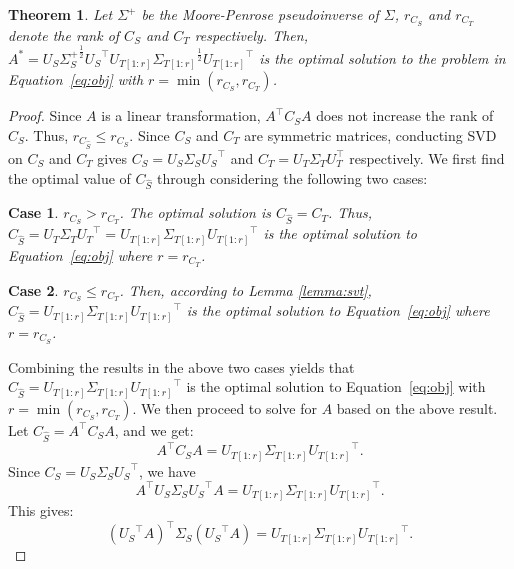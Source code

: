 \documentclass[letterpaper]{article}
\newtheorem{theorem}{Theorem}
\newtheorem{case}{Case}
\begin{document}
\begin{theorem} 
Let $\Sigma^{+}$ be the Moore-Penrose pseudoinverse of $\Sigma$, $r_{C_S}$ and $r_{C_T}$ denote the rank of $C_S$ and $C_T$ respectively.
Then, $A^{*} = U_{S}{\Sigma_S^{+}}^{\frac{1}{2}}{U_{S}}^{\top} U_{T[1:r]}{\Sigma_{T[1:r]}}^{\frac{1}{2}}{U_{T[1:r]}}^{\top}$ is the optimal solution to the problem in Equation~\eqref{eq:obj} with $r = \min(r_{C_S}, r_{C_T})$.
\end{theorem}
\begin{proof}  Since $A$ is a linear transformation, $A^{\top}C_SA$ does not increase the rank of $C_S$. Thus, $r_{C_{\hat{S}}}\leqslant{r_{C_{S}}}$. Since $C_S$ and $C_T$ are symmetric matrices, conducting SVD on $C_S$ and $C_T$ gives $C_S=U_S{\Sigma_S}{U_S}^{\top}$ and $C_T = U_T\Sigma_TU_T^\top$ respectively. We first find the optimal value of $C_{\hat{S}}$ through considering the following two  cases:
\vspace{-0.05in}
\begin{case}
$r_{C_S}>{r_{C_T}}$. The optimal solution is $C_{\hat{S}} = C_T$. Thus, $C_{\hat{S}} = U_{T}{\Sigma_{T}}{U_{T}}^{\top} = U_{T[1:r]}{\Sigma_{T[1:r]}}{U_{T[1:r]}}^{\top}$ is the optimal solution to Equation~\eqref{eq:obj} where $r = r_{C_T}$.
\end{case}
\vspace{-0.05in}
\begin{case}
$r_{C_S}\leqslant{r_{C_T}}$. Then, according to Lemma \ref{lemma:svt}, $C_{\hat{S}} = U_{T[1:r]}{\Sigma_{T[1:r]}}{U_{T[1:r]}}^{\top}$ is the optimal solution to Equation~\eqref{eq:obj} where $r = r_{C_S}$.
\end{case}
Combining the results in the above two cases yields that ${{C_{\hat{S}}}} = U_{T[1:r]}{\Sigma_{T[1:r]}}{U_{T[1:r]}}^{\top}$ is the optimal solution to Equation~\eqref{eq:obj} with $r = \min(r_{C_S}, r_{C_T})$.
We then proceed to solve for $A$ based on the above result. 
Let $C_{\hat{S}} = {A}^{\top}C_S A$, and we get:
\begin{equation*}
{A}^{\top}C_{S}{A}= U_{T[1:r]}{\Sigma_{T[1:r]}}{U_{T[1:r]}}^{\top}.
\end{equation*}
Since $C_S = U_S \Sigma_S {U_S}^\top$, we have
\begin{equation*}
{A}^{\top}U_S{\Sigma_S}{U_S}^{\top}{A}= U_{T[1:r]}{\Sigma_{T[1:r]}}{U_{T[1:r]}}^{\top}.
\end{equation*}
This gives:
\begin{equation*}
{({U_S}^{\top}A)}^{\top}{\Sigma_S}({U_S}^{\top}{A})= U_{T[1:r]}{\Sigma_{T[1:r]}}{U_{T[1:r]}}^{\top}.

\end{equation*}
\end{proof}
\end{document}
